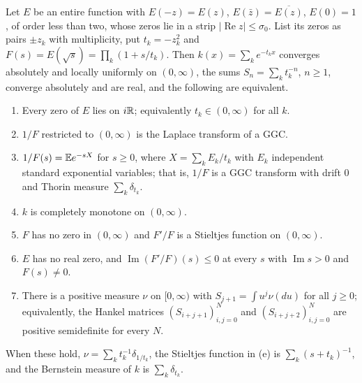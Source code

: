 \begin{theorem}\label{thm:10babstract}
Let $E$ be an entire function with $E(-z) = E(z)$, $E(\bar z) = \overline{E(z)}$, $E(0)=1$, of order less than two, whose zeros lie in a strip $|\operatorname{Re}z|\le\sigma_0$. List its zeros as pairs $\pm z_k$ with multiplicity, put $t_k = -z_k^2$ and $F(s) = E(\sqrt s) = \prod_k(1+s/t_k)$. Then $k(x) = \sum_ke^{-t_kx}$ converges absolutely and locally uniformly on $(0,\infty)$, the sums $S_n = \sum_kt_k^{-n}$, $n\ge1$, converge absolutely and are real, and the following are equivalent.
\begin{enumerate}
\item[(a)] Every zero of $E$ lies on $i\mathbb{R}$; equivalently $t_k\in(0,\infty)$ for all $k$.
\item[(b)] $1/F$ restricted to $(0,\infty)$ is the Laplace transform of a GGC.
\item[(c)] $1/F(s) = \mathbb{E} e^{-sX}$ for $s\ge0$, where $X = \sum_kE_k/t_k$ with $E_k$ independent standard exponential variables; that is, $1/F$ is a GGC transform with drift $0$ and Thorin measure $\sum_k\delta_{t_k}$.
\item[(d)] $k$ is completely monotone on $(0,\infty)$.
\item[(e)] $F$ has no zero in $(0,\infty)$ and $F'/F$ is a Stieltjes function on $(0,\infty)$.
\item[(e$'$)] $E$ has no real zero, and $\operatorname{Im}(F'/F)(s)\le0$ at every $s$ with $\operatorname{Im}s>0$ and $F(s)\ne0$.
\item[(f)] There is a positive measure $\nu$ on $[0,\infty)$ with $S_{j+1} = \int u^j\nu(du)$ for all $j\ge0$; equivalently, the Hankel matrices $(S_{i+j+1})_{i,j=0}^N$ and $(S_{i+j+2})_{i,j=0}^N$ are positive semidefinite for every $N$.
\end{enumerate}
When these hold, $\nu = \sum_kt_k^{-1}\delta_{1/t_k}$, the Stieltjes function in (e) is $\sum_k(s+t_k)^{-1}$, and the Bernstein measure of $k$ is $\sum_k\delta_{t_k}$.
\end{theorem}

